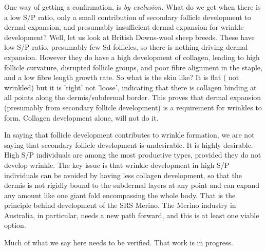 \documentclass[titlepage]{article}  %
\begin{document}
One way of getting a confirmation, is {\em by exclusion}. What do we get when there is a low S/P ratio, only a small contribution of secondary follicle development to dermal expansion, and presumably insufficient dermal expansion for wrinkle development? Well, let us look at British Downs-wool sheep breeds. These have low S/P ratio, presumably few Sd follicles, so there is nothing driving dermal expansion. However they do have a high development of collagen, leading to high follicle curvature, disrupted follicle groups, and poor fibre alignment in the staple, and a low fibre length growth rate. So what is the skin like? It is flat ( not wrinkled) but it is 'tight' not 'loose', indicating that there is collagen binding at all points along the dermis/subdermal border. This proves that dermal expansion (presumably from secondary follicle development) is a requirement for wrinkles to form. Collagen development alone, will not do it.

In saying that follicle development contributes to wrinkle formation, we are not saying that secondary follicle development is undesirable. It is highly desirable. High S/P individuals are among the most productive types, provided they do not develop wrinkle. The key issue is that wrinkle development in high S/P individuals can be avoided by having less collagen development, so that the dermis is not rigidly bound to the subdermal layers at any point and can expand any amount like one giant fold encompassing the whole body. That is the principle behind development of the SRS Merino. The Merino industry in Australia, in particular, needs a new path forward, and this is at least one viable option.

Much of what we say here needs to be verified. That work is in progress.
\end{document}
